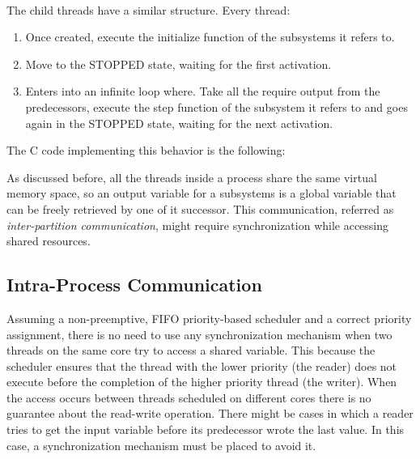 \paragraph{} The child threads have a similar structure. Every thread:
\begin{enumerate}
\item Once created, execute the initialize function of the subsystems it refers to.
\item Move to the STOPPED state, waiting for the first activation.
\item Enters into an infinite loop where. Take all the require output from the predecessors, execute the step function of the subsystem it refers to and goes again in the STOPPED state, waiting for the next activation.
\end{enumerate}
The C code implementing this behavior is the following:

As discussed before, all the threads inside a process share the same virtual memory space, so an output variable for a subsystems is a global variable that can be freely retrieved by one of it successor. This communication, referred as \emph{inter-partition communication}, might require synchronization while accessing shared resources.

\subsection{Intra-Process Communication}
Assuming a non-preemptive, FIFO priority-based scheduler and a correct priority assignment, there is no need to use any synchronization mechanism when two threads on the same core try to access a shared variable. This because the scheduler ensures that the thread with the lower priority (the reader) does not execute before the completion of the higher priority thread (the writer). When the access occurs between threads scheduled on different cores there is no guarantee about the read-write operation. There might be cases in which a reader tries to get the input variable before its predecessor wrote the last value. In this case, a synchronization mechanism must be placed to avoid it.


